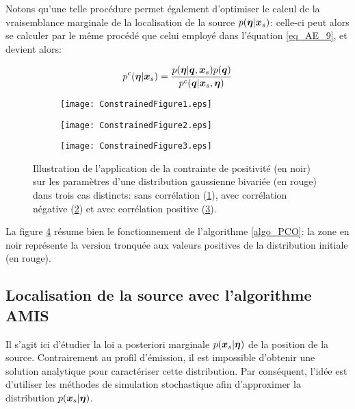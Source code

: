 {Notons qu'une telle procédure permet également d'optimiser le calcul de la vraisemblance marginale de la localisation de la source $p({\bm{\eta}} | {\bm{x}_s})$: celle-ci peut alors se calculer par le même procédé que celui employé dans l'équation \eqref{eq_AE_9}, et devient alors:

\begin{equation}
p^c({\bm{\eta}} | {\bm{x}_s}) = \dfrac{p({\bm{\eta}} | {\bm{q}}, {\bm{x}_s})p({\bm{q}})}{p^c({\bm{q}} | {\bm{x}_s}, {\bm{\eta}})}
\label{eq_AE_17}
\end{equation}


 \begin{figure}[h!]
 	\centering
 	\begin{subfigure}[t]{0.5\textwidth}
 		\centering
		\texttt{[image: ConstrainedFigure1.eps]}
		\caption{}
 		\label{fig_AE_2_a}
 	\end{subfigure}%
 	\begin{subfigure}[t]{0.5\textwidth}
 		\centering
		\texttt{[image: ConstrainedFigure2.eps]}
		\caption{}
 		\label{fig_AE_2_b}
 	\end{subfigure}
 	\begin{subfigure}[t]{0.5\textwidth}
 		\centering
 		\texttt{[image: ConstrainedFigure3.eps]}
 		\caption{}
 		\label{fig_AE_2_c}
 	\end{subfigure} 

 	\caption{Illustration de l'application de la contrainte de positivité (en noir) sur les paramètres d'une distribution gaussienne bivariée (en rouge) dans trois cas distincts: sans corrélation (\ref{fig_AE_2_a}), avec corrélation négative (\ref{fig_AE_2_b}) et avec corrélation positive (\ref{fig_AE_2_c}).}
 	 \label{fig_AE_2}	
 \end{figure}

La figure \ref{fig_AE_2} résume bien le fonctionnement de l'algorithme \ref{algo_PCO}: la zone en noir représente la version tronquée aux valeurs positives de la distribution initiale (en rouge). 

\subsection{Localisation de la source avec l'algorithme AMIS}

Il s'agit ici d'étudier la loi a posteriori marginale $p({\bm{x}_s} | {\bm{\eta}})$ de la position de la source. Contrairement au profil d'émission, il est {impossible} d'obtenir une solution analytique pour caractériser cette distribution. Par conséquent, {l'idée est d'utiliser les méthodes de simulation stochastique afin d'}approximer la distribution $p({\bm{x}_s} | {\bm{\eta}})$. \\

}
